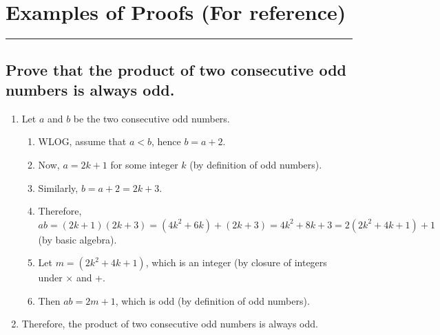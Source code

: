 \documentclass{article}
\begin{document}
\section*{Examples of Proofs (For reference)}
\hrule
\vspace{0.5cm}



\subsection*{Prove that the product of two consecutive odd numbers is always odd.}
\begin{enumerate}
    \item Let $a$ and $b$ be the two consecutive odd numbers. 
    \begin{enumerate}
        \item WLOG, assume that $a<b$, hence $b=a+2$.
        \item Now, $a=2k+1$ for some integer $k$ (by definition of odd numbers).
        \item Similarly, $b=a+2=2k+3$.
        \item Therefore, $ab=(2k+1)(2k+3)=(4k^2+6k)+(2k+3)=4k^2+8k+3=2(2k^2+4k+1)+1$ (by basic algebra).
        \item Let $m=(2k^2+4k+1)$, which is an integer (by closure of integers under $\times$ and +. 
        \item Then $ab=2m+1$, which is odd (by definition of odd numbers).
    \end{enumerate}
    \item Therefore, the product of two consecutive odd numbers is always odd.
\end{enumerate}
\vspace{0.1cm}
\end{document}

